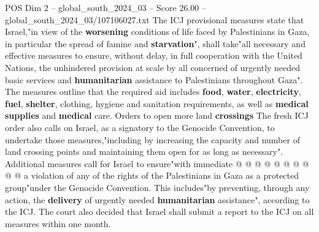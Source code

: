 \begin{textsample}{POS Dim 2 – global\_south\_2024\_03 – Score 26.00 – global\_south\_2024\_03/107106027.txt}
The ICJ provisional measures state that Israel,"in view of the \textbf{worsening} conditions of life faced by Palestinians in Gaza, in particular the spread of famine and \textbf{starvation}", shall take"all necessary and effective measures to ensure, without delay, in full cooperation with the United Nations, the unhindered provision at scale by all concerned of urgently needed basic services and \textbf{humanitarian} assistance to Palestinians throughout Gaza".
The measures outline that the required aid includes \textbf{food}, \textbf{water}, \textbf{electricity}, \textbf{fuel}, \textbf{shelter}, clothing, hygiene and sanitation requirements, as well as \textbf{medical} \textbf{supplies} and \textbf{medical} care.
Orders to open more land \textbf{crossings} The fresh ICJ order also calls on Israel, as a signatory to the Genocide Convention, to undertake those measures,"including by increasing the capacity and number of land crossing points and maintaining them open for as long as necessary".
Additional measures call for Israel to ensure"with immediate @ @ @ @ @ @ @ @ @ @ a violation of any of the rights of the Palestinians in Gaza as a protected group"under the Genocide Convention.
This includes"by preventing, through any action, the \textbf{delivery} of urgently needed \textbf{humanitarian} assistance", according to the ICJ.
The court also decided that Israel shall submit a report to the ICJ on all measures within one month.

\end{textsample}
